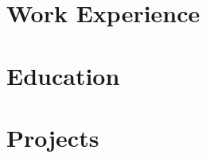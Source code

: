 \documentclass[a4paper, oneside, final]{scrartcl} %
\begin{document}
\begin{center} %


{\fontsize{36}{36}\selectfont\scshape\textls[200]{\MyName{}}} %

\vspace{1.5cm} %




\section{Work Experience}




\section{Education}




\section{Projects}


\end{center}
\end{document}
